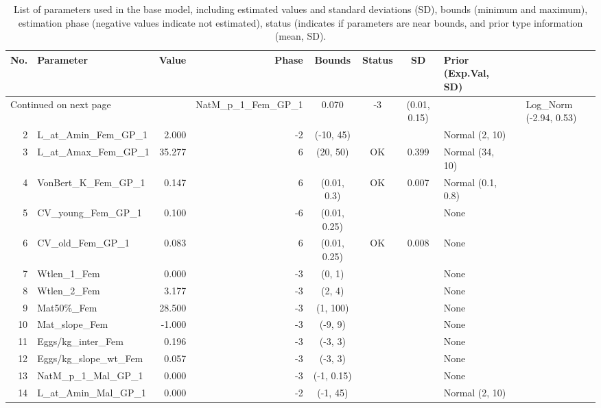\documentclass[12pt,]{article}
\begin{document}
\begin{landscape}
\begin{longtable}{rlrrcccl}
\caption{List of parameters used in
                                              the base model, including estimated 
                                              values and standard deviations (SD), 
                                              bounds (minimum and maximum), 
                                              estimation phase (negative values indicate
                                              not estimated), status (indicates if 
                                              parameters are near bounds, and prior type
                                              information (mean, SD).} \\ 
  \hline
No. & Parameter & Value & Phase & Bounds & Status & SD & Prior (Exp.Val, SD)  \\ 
  \hline 
\endhead 
\hline 
\multicolumn{3}{l}{\footnotesize Continued on next page} 
\endfoot 
\endlastfoot 
 \hline
1 & NatM\_p\_1\_Fem\_GP\_1 & 0.070 & -3 & (0.01, 0.15) &  &  & Log\_Norm (-2.94, 0.53) \\ 
  2 & L\_at\_Amin\_Fem\_GP\_1 & 2.000 & -2 & (-10, 45) &  &  & Normal (2, 10) \\ 
  3 & L\_at\_Amax\_Fem\_GP\_1 & 35.277 & 6 & (20, 50) & OK & 0.399 & Normal (34, 10) \\ 
  4 & VonBert\_K\_Fem\_GP\_1 & 0.147 & 6 & (0.01, 0.3) & OK & 0.007 & Normal (0.1, 0.8) \\ 
  5 & CV\_young\_Fem\_GP\_1 & 0.100 & -6 & (0.01, 0.25) &  &  & None \\ 
  6 & CV\_old\_Fem\_GP\_1 & 0.083 & 6 & (0.01, 0.25) & OK & 0.008 & None \\ 
  7 & Wtlen\_1\_Fem & 0.000 & -3 & (0, 1) &  &  & None \\ 
  8 & Wtlen\_2\_Fem & 3.177 & -3 & (2, 4) &  &  & None \\ 
  9 & Mat50\%\_Fem & 28.500 & -3 & (1, 100) &  &  & None \\ 
  10 & Mat\_slope\_Fem & -1.000 & -3 & (-9, 9) &  &  & None \\ 
  11 & Eggs/kg\_inter\_Fem & 0.196 & -3 & (-3, 3) &  &  & None \\ 
  12 & Eggs/kg\_slope\_wt\_Fem & 0.057 & -3 & (-3, 3) &  &  & None \\ 
  13 & NatM\_p\_1\_Mal\_GP\_1 & 0.000 & -3 & (-1, 0.15) &  &  & None \\ 
  14 & L\_at\_Amin\_Mal\_GP\_1 & 0.000 & -2 & (-1, 45) &  &  & Normal (2, 10) \\ 

\end{longtable}
\end{landscape}
\end{document}
